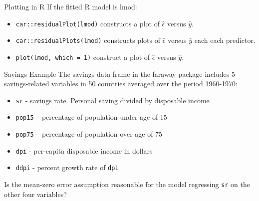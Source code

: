 \begin{frame}[fragile]{Plotting in R}
\protect\hypertarget{plotting-in-r}{}
If the fitted R model is lmod:

\begin{itemize}
\tightlist
\item
  \texttt{car::residualPlot(lmod)} constructs a plot of
  \(\hat{\epsilon}\) versus \(\hat{y}\).
\item
  \texttt{car::residualPlots(lmod)} constructs plots of
  \(\hat{\epsilon}\) versus \(\hat{y}\) each each predictor.
\item
  \texttt{plot(lmod,\ which\ =\ 1)} construct a plot of
  \(\hat{\epsilon}\) versus \(\hat{y}\).
\end{itemize}
\end{frame}

\begin{frame}[fragile]{Savings Example}
\protect\hypertarget{savings-example}{}
The savings data frame in the faraway package includes 5 savings-related
variables in 50 countries averaged over the period 1960-1970:

\begin{itemize}
\tightlist
\item
  \texttt{sr} - savings rate. Personal saving divided by disposable
  income
\item
  \texttt{pop15} -- percentage of population under age of 15
\item
  \texttt{pop75} -- percentage of population over age of 75
\item
  \texttt{dpi} - per-capita disposable income in dollars
\item
  \texttt{ddpi} - percent growth rate of \texttt{dpi}
\end{itemize}

Is the mean-zero error assumption reasonable for the model regressing
\texttt{sr} on the other four variables?

\begin{Shaded}
\begin{Highlighting}[]
 \NormalTok{)}
\StringTok{ }\OperatorTok{\textasciitilde{}}\StringTok{ }
\end{Highlighting}
\end{Shaded}
\end{frame}

